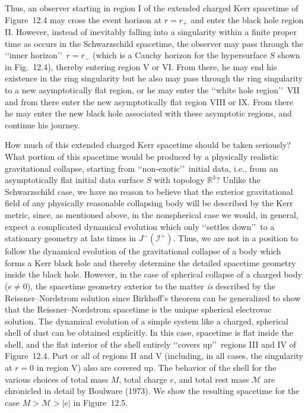 


Thus, an observer starting in region I of the extended charged Kerr spacetime of
Figure~12.4 may cross the event horizon at \(r=r_+\) and enter the black hole region
II. However, instead of inevitably falling into a singularity within a finite proper time
as occurs in the Schwarzschild spacetime, the observer may pass through the
\lq\lq inner horizon\rq\rq\ \(r=r_-\) (which is a Cauchy horizon for the hypersurface
\(S\) shown in Fig.~12.4), thereby entering region V or VI. From there, he may end
his existence in the ring singularity but he also may pass through the ring singularity
to a new asymptotically flat region, or he may enter the \lq\lq white hole region\rq\rq\
VII and from there enter the new asymptotically flat region VIII or IX. From there he
may enter the new black hole associated with these asymptotic regions, and continue
his journey.

How much of this extended charged Kerr spacetime should be taken seriously? What
portion of this spacetime would be produced by a physically realistic gravitational
collapse, starting from \lq\lq non-exotic\rq\rq\ initial data, i.e., from an
asymptotically flat initial data surface \(S\) with topology \(\mathbb R^3\)? Unlike
the Schwarzschild case, we have no reason to believe that the exterior gravitational
field of any physically reasonable collapsing body will be described by the Kerr
metric, since, as mentioned above, in the nonspherical case we would, in general,
expect a complicated dynamical evolution which only \lq\lq settles down\rq\rq\ to a
stationary geometry at late times in \(J^-(\mathcal I^+)\). Thus, we are not in a
position to follow the dynamical evolution of the gravitational collapse of a body
which forms a Kerr black hole and thereby determine the detailed spacetime geometry
inside the black hole. However, in the case of spherical collapse of a charged body
(\(e\ne0\)), the spacetime geometry exterior to the matter \emph{is} described by the
Reissner--Nordstrom solution since Birkhoff's theorem can be generalized to show that
the Reissner--Nordstrom spacetime is the unique spherical electrovac solution. The
dynamical evolution of a simple system like a charged, spherical shell of dust can be
obtained explicitly. In this case, spacetime is flat inside the shell, and the flat
interior of the shell entirely \lq\lq covers up\rq\rq\ regions III and IV of
Figure~12.4. Part or all of regions II and V (including, in all cases, the singularity
at \(r=0\) in region V) also are covered up. The behavior of the shell for the various
choices of total mass \(M\), total charge \(e\), and total rest mass \(\mathcal M\) are
chronicled in detail by Boulware (1973). We show the resulting spacetime for the
case \(M>\mathcal M>|e|\) in Figure~12.5.

